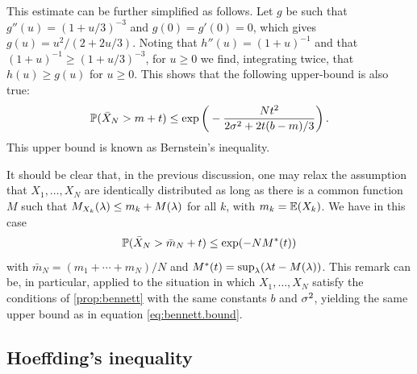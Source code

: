 This estimate can be further simplified as follows. Let $g$ be such that  $g''(u) = (1+u/3)^{-3}$ and $g(0) = g'(0) = 0$, which gives
$g(u) = u^2/(2 + 2u/3)$.
Noting that $h''(u) = (1+u)^{-1}$ and that $(1+u)^{-1} \geq (1+u/3)^{-3}$, for $u\geq 0$ we find, integrating twice, that $h(u) \geq g(u)$ for $u\geq 0$.   This shows that the following upper-bound is also true:
\begin{equation}
\label{eq:bennett.bound.3}
\bm{\mathbb P}(\bar X_N > m+t) \leq \exp\bigg(- \frac{Nt^2}{2\sigma^2 + 2t(b-m)/3}\bigg)\,.
\end{equation}
This upper bound is known as Bernstein's inequality.

\begin{remark}
It should be clear that, in the previous discussion, one may relax the assumption that $X_1, \ldots, X_N$ are identically distributed as long as there is a common function $M$ such that $M_{X_k}(\lambda) \leq m_k + M(\lambda)$ for all $k$, with $m_k = \bm{\mathbb E}(X_k)$. We have in this case
\[
\bm{\mathbb P}(\bar X_N > \bar m_N +t) \leq \exp(-N M^*(t))
\]
with $\bar m_N = (m_1 + \cdots + m_N)/N$ and $M^*(t) = \sup_\lambda (\lambda t - M(\lambda))$. This remark can be, in particular, applied to the situation in which $X_1, \ldots, X_N$ satisfy the conditions of  \cref{prop:bennett} with the same constants $b$ and $\sigma^2$, yielding the same upper bound as in  equation \eqref{eq:bennett.bound}. 
\end{remark}


\subsection{Hoeffding's inequality}


